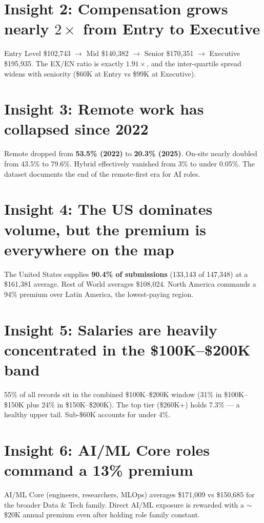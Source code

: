 \documentclass[11pt,a4paper,oneside]{report}
\begin{document}
\section{Insight 2: Compensation grows nearly $2\times$ from Entry to Executive}
\begin{insightbox}
Entry Level \$102,743 $\to$ Mid \$140,382 $\to$ Senior \$170,351 $\to$ Executive \$195,935. The EX/EN ratio is exactly $1.91\times$, and the inter-quartile spread widens with seniority (\$60K at Entry vs \$99K at Executive).
\end{insightbox}

\section{Insight 3: Remote work has collapsed since 2022}
\begin{insightbox}
Remote dropped from \textbf{53.5\% (2022)} to \textbf{20.3\% (2025)}. On-site nearly doubled from 43.5\% to 79.6\%. Hybrid effectively vanished from 3\% to under 0.05\%. The dataset documents the end of the remote-first era for AI roles.
\end{insightbox}

\section{Insight 4: The US dominates volume, but the premium is everywhere on the map}
\begin{insightbox}
The United States supplies \textbf{90.4\% of submissions} (133,143 of 147,348) at a \$161,381 average. Rest of World averages \$108,024. North America commands a 94\% premium over Latin America, the lowest-paying region.
\end{insightbox}

\section{Insight 5: Salaries are heavily concentrated in the \$100K--\$200K band}
\begin{insightbox}
55\% of all records sit in the combined \$100K--\$200K window (31\% in \$100K--\$150K plus 24\% in \$150K--\$200K). The top tier (\$260K+) holds 7.3\% --- a healthy upper tail. Sub-\$60K accounts for under 4\%.
\end{insightbox}

\section{Insight 6: AI/ML Core roles command a 13\% premium}
\begin{insightbox}
AI/ML Core (engineers, researchers, MLOps) averages \$171,009 vs \$150,685 for the broader Data \& Tech family. Direct AI/ML exposure is rewarded with a $\sim$\$20K annual premium even after holding role family constant.
\end{insightbox}
\end{document}
